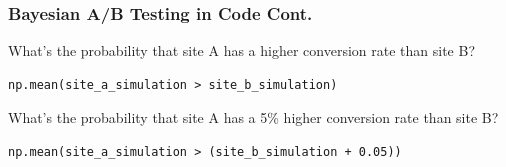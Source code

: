 \documentclass{beamer}
\begin{document}
\begin{frame}[fragile]
  \frametitle{Bayesian A/B Testing in Code Cont.}
  What's the probability that site A has a higher conversion rate than site B? \vspace{2mm}
  \begin{lstlisting}[firstnumber=11]
  np.mean(site_a_simulation > site_b_simulation)
  \end{lstlisting} \vspace{4mm}
  \pause

  What's the probability that site A has a 5\% higher conversion rate than site B? \vspace{2mm}
  \begin{lstlisting}[firstnumber=12]
  np.mean(site_a_simulation > (site_b_simulation + 0.05))
  \end{lstlisting}
\end{frame}
\end{document}
